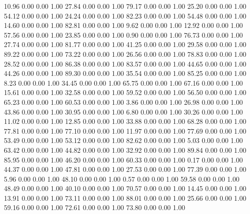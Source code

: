    10.96   0.00   0.00   1.00
   27.84   0.00   0.00   1.00
   79.17   0.00   0.00   1.00
   25.20   0.00   0.00   1.00
   54.12   0.00   0.00   1.00
   24.24   0.00   0.00   1.00
   82.23   0.00   0.00   1.00
   54.48   0.00   0.00   1.00
   14.60   0.00   0.00   1.00
   82.81   0.00   0.00   1.00
    9.62   0.00   0.00   1.00
   12.92   0.00   0.00   1.00
   57.56   0.00   0.00   1.00
   23.85   0.00   0.00   1.00
    0.90   0.00   0.00   1.00
   76.73   0.00   0.00   1.00
   27.74   0.00   0.00   1.00
   81.77   0.00   0.00   1.00
   41.25   0.00   0.00   1.00
   29.58   0.00   0.00   1.00
   89.22   0.00   0.00   1.00
   73.22   0.00   0.00   1.00
   26.56   0.00   0.00   1.00
   78.83   0.00   0.00   1.00
   28.52   0.00   0.00   1.00
   86.38   0.00   0.00   1.00
   83.57   0.00   0.00   1.00
   44.65   0.00   0.00   1.00
   44.26   0.00   0.00   1.00
   89.30   0.00   0.00   1.00
   35.54   0.00   0.00   1.00
   85.25   0.00   0.00   1.00
    8.23   0.00   0.00   1.00
   34.45   0.00   0.00   1.00
   65.75   0.00   0.00   1.00
   67.16   0.00   0.00   1.00
   15.61   0.00   0.00   1.00
   32.58   0.00   0.00   1.00
   59.52   0.00   0.00   1.00
   56.50   0.00   0.00   1.00
   65.23   0.00   0.00   1.00
   60.53   0.00   0.00   1.00
    3.86   0.00   0.00   1.00
   26.98   0.00   0.00   1.00
   43.86   0.00   0.00   1.00
   30.95   0.00   0.00   1.00
    6.80   0.00   0.00   1.00
   30.26   0.00   0.00   1.00
   11.02   0.00   0.00   1.00
   12.85   0.00   0.00   1.00
   33.88   0.00   0.00   1.00
   68.28   0.00   0.00   1.00
   77.81   0.00   0.00   1.00
   77.10   0.00   0.00   1.00
   11.97   0.00   0.00   1.00
   77.69   0.00   0.00   1.00
   53.49   0.00   0.00   1.00
   53.12   0.00   0.00   1.00
   82.62   0.00   0.00   1.00
    5.03   0.00   0.00   1.00
   63.42   0.00   0.00   1.00
   44.82   0.00   0.00   1.00
   32.92   0.00   0.00   1.00
   89.84   0.00   0.00   1.00
   85.95   0.00   0.00   1.00
   46.20   0.00   0.00   1.00
   60.33   0.00   0.00   1.00
    0.17   0.00   0.00   1.00
   44.37   0.00   0.00   1.00
   47.81   0.00   0.00   1.00
   27.53   0.00   0.00   1.00
   77.39   0.00   0.00   1.00
    5.96   0.00   0.00   1.00
   48.10   0.00   0.00   1.00
    0.57   0.00   0.00   1.00
   59.58   0.00   0.00   1.00
   48.49   0.00   0.00   1.00
   40.10   0.00   0.00   1.00
   70.57   0.00   0.00   1.00
   14.45   0.00   0.00   1.00
   13.91   0.00   0.00   1.00
   73.11   0.00   0.00   1.00
   88.01   0.00   0.00   1.00
   25.66   0.00   0.00   1.00
   59.16   0.00   0.00   1.00
   72.61   0.00   0.00   1.00
   73.80   0.00   0.00   1.00

